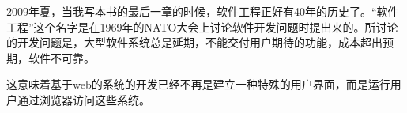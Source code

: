 2009年夏，当我写本书的最后一章的时候，软件工程正好有40年的历史了。“软件工程”这个名字是在1969年的NATO大会上讨论软件开发问题时提出来的。所讨论的开发问题是，大型软件系统总是延期，不能交付用户期待的功能，成本超出预期，软件不可靠。
\par 这意味着基于web的系统的开发已经不再是建立一种特殊的用户界面，而是运行用户通过浏览器访问这些系统。
